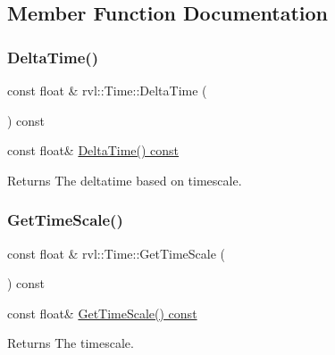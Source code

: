 \subsection{Member Function Documentation}
\mbox{\label{classrvl_1_1_time_a615b7d43aa2832dd6ffb235de22044cc}} 
\subsubsection{\texorpdfstring{Delta\+Time()}{DeltaTime()}}
{\footnotesize\ttfamily const float \& rvl\+::\+Time\+::\+Delta\+Time (\begin{DoxyParamCaption}{ }\end{DoxyParamCaption}) const}



const float\& \hyperlink{classrvl_1_1_time_a615b7d43aa2832dd6ffb235de22044cc}{Delta\+Time() const} 

\begin{DoxyReturn}{Returns}
The deltatime based on timescale. 
\end{DoxyReturn}
\mbox{\label{classrvl_1_1_time_adc601517b317a98bc72a1dd87826ae4e}} 
\subsubsection{\texorpdfstring{Get\+Time\+Scale()}{GetTimeScale()}}
{\footnotesize\ttfamily const float \& rvl\+::\+Time\+::\+Get\+Time\+Scale (\begin{DoxyParamCaption}{ }\end{DoxyParamCaption}) const}



const float\& \hyperlink{classrvl_1_1_time_adc601517b317a98bc72a1dd87826ae4e}{Get\+Time\+Scale() const} 

\begin{DoxyReturn}{Returns}
The timescale. 
\end{DoxyReturn}
\mbox{\label{classrvl_1_1_time_a6033a29cb79140a95337f78fe3de4f8a}} 
